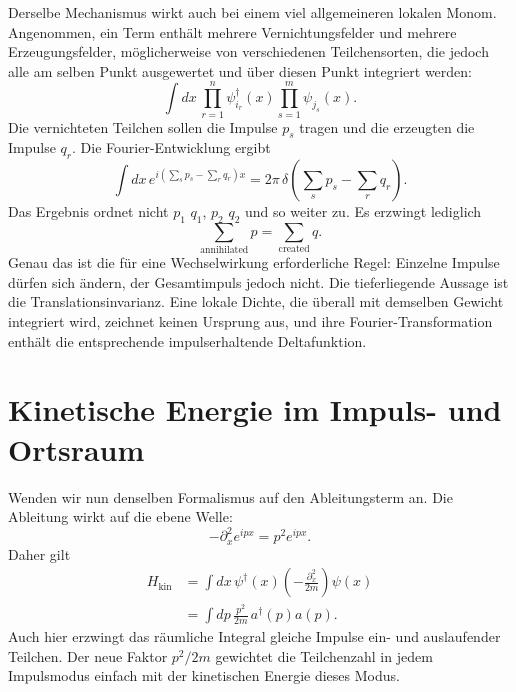 Derselbe Mechanismus wirkt auch bei einem viel allgemeineren lokalen Monom. Angenommen, ein Term enthält mehrere Vernichtungsfelder und mehrere Erzeugungsfelder, möglicherweise von verschiedenen Teilchensorten, die jedoch alle am selben Punkt ausgewertet und über diesen Punkt integriert werden:
\begin{equation}
\int dx\,
\prod_{r=1}^{n} \psi_{i_r}^\dagger(x)
\prod_{s=1}^{m} \psi_{j_s}(x).
\end{equation}
Die vernichteten Teilchen sollen die Impulse \(p_s\) tragen und die erzeugten die Impulse \(q_r\). Die Fourier-Entwicklung ergibt
\begin{equation}
\int dx\,
e^{i(\sum_s p_s-\sum_r q_r)x}
=2\pi\,
\delta\!\left(\sum_s p_s-\sum_r q_r\right).
\label{eq:l9-total-momentum-delta}
\end{equation}
Das Ergebnis ordnet nicht \(p_1\) \(q_1\), \(p_2\) \(q_2\) und so weiter zu. Es erzwingt lediglich
\begin{equation}
\sum_{\mathrm{annihilated}}p
=
\sum_{\mathrm{created}}q.
\end{equation}
Genau das ist die für eine Wechselwirkung erforderliche Regel: Einzelne Impulse dürfen sich ändern, der Gesamtimpuls jedoch nicht. Die tieferliegende Aussage ist die Translationsinvarianz. Eine lokale Dichte, die überall mit demselben Gewicht integriert wird, zeichnet keinen Ursprung aus, und ihre Fourier-Transformation enthält die entsprechende impuls­erhaltende Deltafunktion.

\begin{classroomqa}\end{classroomqa}

\section{Kinetische Energie im Impuls- und Ortsraum}

Wenden wir nun denselben Formalismus auf den Ableitungsterm an. Die Ableitung wirkt auf die ebene Welle:
\begin{equation}
-\partial_x^2 e^{ipx}=p^2e^{ipx}.
\end{equation}
Daher gilt
\begin{align}
H_{\mathrm{kin}}
&=\int dx\,\psi^\dagger(x)
\left(-\frac{\partial_x^2}{2m}\right)\psi(x)\\
&=\int dp\,\frac{p^2}{2m}\,a^\dagger(p)a(p).
\label{eq:l9-kinetic-momentum}
\end{align}
Auch hier erzwingt das räumliche Integral gleiche Impulse ein- und auslaufender Teilchen. Der neue Faktor \(p^2/2m\) gewichtet die Teilchenzahl in jedem Impulsmodus einfach mit der kinetischen Energie dieses Modus.

